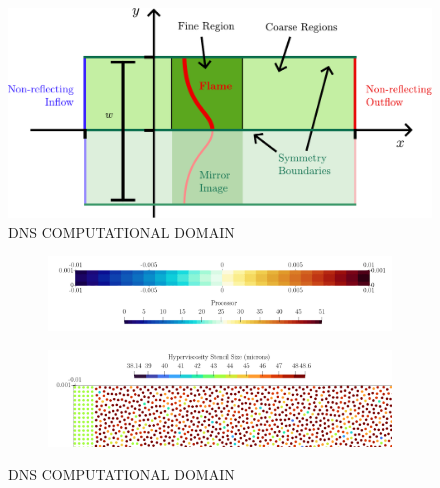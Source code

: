 \begin{figure}[t]
\centering
\includegraphics[scale=0.65]{assets/imgs/DNS-computational-domain.pdf}
\caption{DNS COMPUTATIONAL DOMAIN}
\label{fig:DNS-domain}
\end{figure}

\begin{figure}[t]
\centering
    \begin{subfigure}{0.99\textwidth}
    \centering
    \includegraphics[scale=0.25]{assets/graphs/flame-sim-discretisation.png}
    \caption{}
    \label{fig:disc1}
    \end{subfigure}

\vspace*{0.5em}

    \begin{subfigure}{0.99\textwidth}
    \centering
    \includegraphics[scale=0.25]{assets/graphs/flame-sim-discretisation_zoom.png}
    \caption{}
    \label{fig:disc2}
    \end{subfigure}
\caption{DNS COMPUTATIONAL DOMAIN}
\label{fig:disc}
\end{figure}

